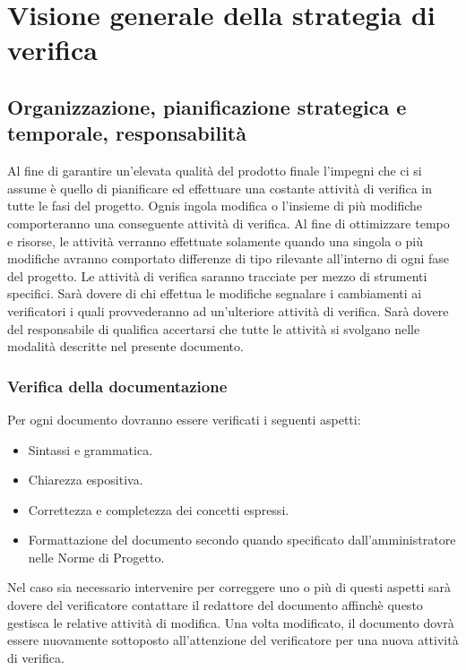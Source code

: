 


\chapter{Visione generale della strategia di verifica}
\thispagestyle{fancy} %

\section{Organizzazione, pianificazione strategica e temporale, responsabilit\`a}

Al fine di garantire un'elevata qualit\`a del prodotto finale l'impegni che ci si
assume \`e quello di pianificare ed effettuare una costante attivit\`a di
verifica in tutte le fasi del progetto. Ognis ingola modifica o l'insieme di
pi\`u modifiche comporteranno una conseguente attivit\`a di verifica. Al fine di
ottimizzare tempo e risorse, le attivit\`a verranno effettuate solamente quando
una singola o pi\`u modifiche avranno comportato differenze di tipo rilevante
all'interno di ogni fase del progetto. Le attivit\`a di verifica saranno
tracciate per mezzo di strumenti specifici. Sar\`a dovere di chi effettua le
modifiche segnalare i cambiamenti ai verificatori i quali provvederanno ad
un'ulteriore attivit\`a di verifica. Sar\`a dovere del responsabile di qualifica
accertarsi che tutte le attivit\`a si svolgano nelle modalit\`a descritte nel presente documento.

\subsection{Verifica della documentazione}

Per ogni documento dovranno essere verificati i seguenti aspetti:
\begin{itemize}
\item Sintassi e grammatica.
\item Chiarezza espositiva.
\item Correttezza e completezza dei concetti espressi.
\item Formattazione del documento secondo quando specificato dall'amministratore
nelle Norme di Progetto.
\end{itemize}

Nel caso sia necessario intervenire per correggere uno o pi\`u di questi aspetti
sar\`a dovere del verificatore contattare il redattore del documento affinch\`e
questo gestisca le relative attivit\`a di modifica. Una volta modificato, il
documento dovr\`a essere nuovamente sottoposto all'attenzione del verificatore
per una nuova attivit\`a di verifica.

